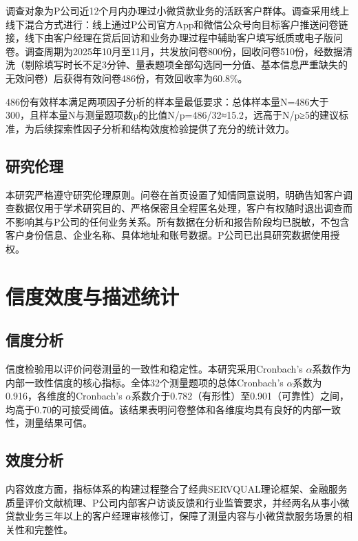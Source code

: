 调查对象为P公司近12个月内办理过小微贷款业务的活跃客户群体。调查采用线上线下混合方式进行：线上通过P公司官方App和微信公众号向目标客户推送问卷链接，线下由客户经理在贷后回访和业务办理过程中辅助客户填写纸质或电子版问卷。调查周期为2025年10月至11月，共发放问卷800份，回收问卷510份，经数据清洗（剔除填写时长不足3分钟、量表题项全部勾选同一分值、基本信息严重缺失的无效问卷）后获得有效问卷486份，有效回收率为60.8\%。\par

486份有效样本满足两项因子分析的样本量最低要求：总体样本量N=486大于300，且样本量N与测量题项数p的比值N/p=486/32≈15.2，远高于N/p≥5的建议标准，为后续探索性因子分析和结构效度检验提供了充分的统计效力。\par

\subsection{研究伦理}

本研究严格遵守研究伦理原则。问卷在首页设置了知情同意说明，明确告知客户调查数据仅用于学术研究目的、严格保密且全程匿名处理，客户有权随时退出调查而不影响其与P公司的任何业务关系。所有数据在分析和报告阶段均已脱敏，不包含客户身份信息、企业名称、具体地址和账号数据。P公司已出具研究数据使用授权。\par

\section{信度效度与描述统计}

\subsection{信度分析}

信度检验用以评价问卷测量的一致性和稳定性。本研究采用Cronbach's $\alpha$系数作为内部一致性信度的核心指标。全体32个测量题项的总体Cronbach's $\alpha$系数为0.916，各维度的Cronbach's $\alpha$系数介于0.782（有形性）至0.901（可靠性）之间，均高于0.70的可接受阈值。该结果表明问卷整体和各维度均具有良好的内部一致性，测量结果可信。\par

\subsection{效度分析}

内容效度方面，指标体系的构建过程整合了经典SERVQUAL理论框架\cite{ref14}、金融服务质量评价文献梳理、P公司内部客户访谈反馈和行业监管要求，并经两名从事小微贷款业务三年以上的客户经理审核修订，保障了测量内容与小微贷款服务场景的相关性和完整性。\par


